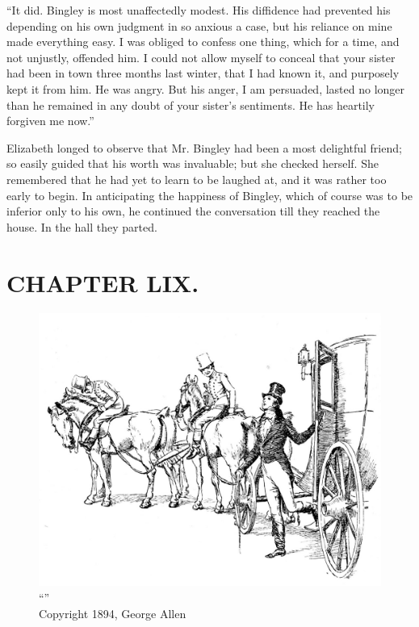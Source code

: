 ``It did. Bingley is most unaffectedly modest. His diffidence had prevented his depending on his own judgment in so anxious a case, but his reliance on mine made everything easy. I was obliged to confess one thing, which for a time, and not unjustly, offended him. I could not allow myself to conceal that your sister had been in town three months last winter, that I had known it, and purposely kept it from him. He was angry. But his anger, I am persuaded, lasted no longer than he remained in any doubt of your sister's sentiments. He has heartily forgiven me now.''

Elizabeth longed to observe that Mr. Bingley had been a most delightful friend; so easily guided that his worth was invaluable; but she checked herself. She remembered that he had yet to learn to be laughed at, and it was rather too early to begin. In anticipating the happiness of Bingley, which of course was to be inferior only to his own, he continued the conversation till they reached the house. In the hall they parted.



\chapter{CHAPTER LIX.}

\begin{figure}[htbp]
    \centering
    \includegraphics[width=\textwidth]{illustrations/i_031.jpg}
    \caption{“”\\ Copyright 1894, George Allen}
    \label{fig:image}
\end{figure}


